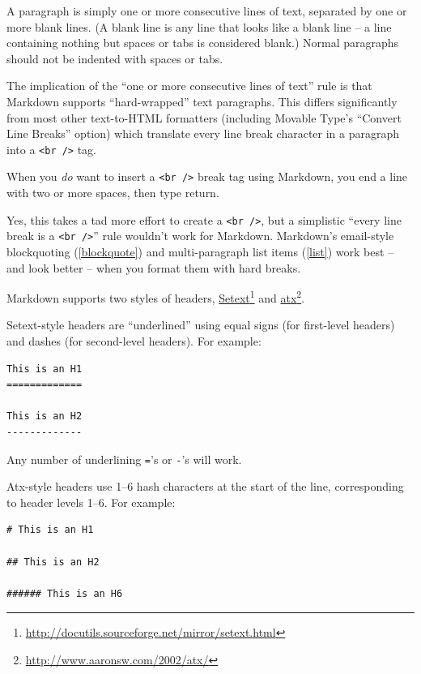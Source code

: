 A paragraph is simply one or more consecutive lines of text, separated
by one or more blank lines. (A blank line is any line that looks like a
blank line -- a line containing nothing but spaces or tabs is considered
blank.) Normal paragraphs should not be indented with spaces or tabs.

The implication of the ``one or more consecutive lines of text'' rule is
that Markdown supports ``hard-wrapped'' text paragraphs. This differs
significantly from most other text-to-HTML formatters (including Movable
Type's ``Convert Line Breaks'' option) which translate every line break
character in a paragraph into a \texttt{<br />} tag.

When you \emph{do} want to insert a \texttt{<br />} break tag using Markdown, you
end a line with two or more spaces, then type return.

Yes, this takes a tad more effort to create a \texttt{<br />}, but a simplistic
``every line break is a \texttt{<br />}'' rule wouldn't work for Markdown.
Markdown's email-style blockquoting (\autoref{blockquote}) and multi-paragraph list items (\autoref{list})
work best -- and look better -- when you format them with hard breaks.

Markdown supports two styles of headers, \href{http://docutils.sourceforge.net/mirror/setext.html}{Setext}\footnote{\href{http://docutils.sourceforge.net/mirror/setext.html}{http://docutils.sourceforge.net/mirror/setext.html}} and \href{http://www.aaronsw.com/2002/atx/}{atx}\footnote{\href{http://www.aaronsw.com/2002/atx/}{http://www.aaronsw.com/2002/atx/}}.

Setext-style headers are ``underlined'' using equal signs (for first-level
headers) and dashes (for second-level headers). For example:

\begin{verbatim}
This is an H1
=============

This is an H2
-------------
\end{verbatim}

Any number of underlining \texttt{=}'s or \texttt{-}'s will work.

Atx-style headers use 1--6 hash characters at the start of the line,
corresponding to header levels 1--6. For example:

\begin{verbatim}
# This is an H1

## This is an H2

###### This is an H6
\end{verbatim}

